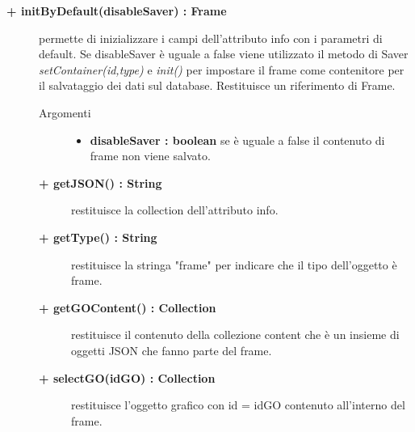 \begin{description}
\begin{description}
\end{description}

\begin{description}
		\item[\textbf{\color{blue}+ initByDefault(disableSaver) : Frame			}] \hfill
			permette di inizializzare i campi dell'attributo info con i parametri di default. Se disableSaver è uguale a false viene utilizzato il metodo di Saver \textit{setContainer(id,type)} e \textit{init()} per impostare il frame come contenitore per il salvataggio dei dati sul database. Restituisce un riferimento di Frame.

\begin{description}
			\item[Argomenti] \hfill
				\begin{itemize}
						\item \textbf{disableSaver : boolean			} \hfill
					se è uguale a false il contenuto di frame non viene salvato. %
				\end{itemize}

\end{description}

\begin{description}
		\item[\textbf{\color{blue}+ getJSON() : String			}] \hfill
			restituisce la collection dell'attributo info.

\end{description}

\begin{description}
		\item[\textbf{\color{blue}+ getType() : String			}] \hfill
			restituisce la stringa "frame" per indicare che il tipo dell'oggetto è frame.
\end{description}

\begin{description}
		\item[\textbf{\color{blue}+ getGOContent() : Collection			}] \hfill
			restituisce il contenuto della collezione content che è un insieme di oggetti JSON che fanno parte del frame.
\end{description}

\begin{description}
		\item[\textbf{\color{blue}+ selectGO(idGO) : Collection			}] \hfill
			restituisce l'oggetto grafico con id = idGO contenuto all'interno del frame. 


\end{description}
\end{description}
\end{description}
